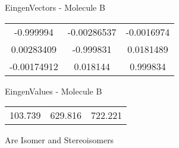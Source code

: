 \begin{multicols}{2}
\begin{center}
\vtab
 EingenVectors - Molecule B     \\
\vtab
\begin{tabular}{|c c c|}
-0.999994	 & 	-0.00286537	 & 	-0.0016974	 \\
0.00283409	 & 	-0.999831	 & 	0.0181489	 \\
-0.00174912	 & 	0.018144	 & 	0.999834
\end{tabular}

\vtab
 EingenValues - Molecule B     \\
\vtab
\begin{tabular}{|c c c|}
103.739	 & 	629.816	 & 	722.221
\end{tabular}

\end{center}
\end{multicols}
\begin{center}
\vtab
\vtab
\textcolor{NavyBlue}{\Large Are Isomer and Stereoisomers}
\end{center}
\newpage

